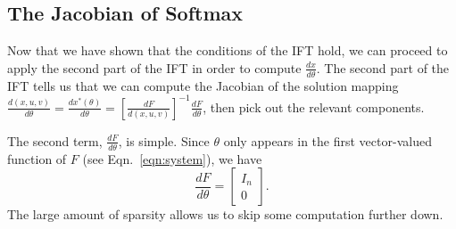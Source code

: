 \documentclass[11pt]{article}
\begin{document}
\subsection{The Jacobian of Softmax}
Now that we have shown that the conditions of the IFT hold,
we can proceed to apply the second part of the IFT in order to compute $\frac{dx}{d\theta}$.
The second part of the IFT tells us that we can compute the Jacobian of the
solution mapping $\frac{d(x,u,v)}{d\theta} = \frac{dx^*(\theta)}{d\theta}
= \left[\frac{dF}{d(x,u,v)}\right]^{-1}\frac{dF}{d\theta}$,
then pick out the relevant components.

The second term, $\frac{dF}{d\theta}$, is simple.
Since $\theta$ only appears in the first vector-valued function of $F$
(see Eqn.~\ref{eqn:system}), we have
\begin{equation}
\label{eqn:df-dtheta}
\frac{dF}{d\theta} = \begin{bmatrix}
    I_n\\
    0
\end{bmatrix}.
\end{equation}
The large amount of sparsity allows us to skip some computation further down.
\end{document}

